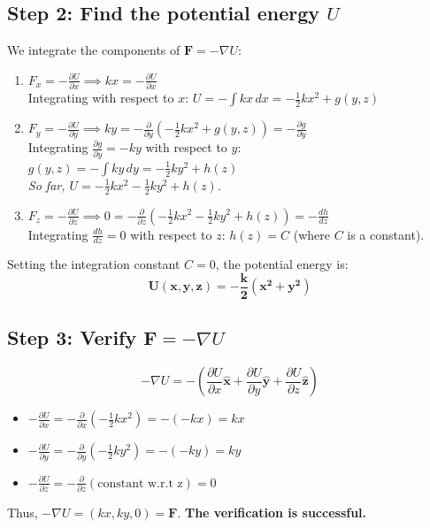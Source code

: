 \documentclass[11pt, a4paper]{article} %
\begin{document}
\subsection*{Step 2: Find the potential energy $U$}
We integrate the components of $\mathbf{F} = -\nabla U$:
\begin{enumerate}
    \item $F_x = -\frac{\partial U}{\partial x} \implies kx = -\frac{\partial U}{\partial x}$ \\
    Integrating with respect to $x$:
    $U = -\int kx \, dx = -\frac{1}{2}kx^2 + g(y, z)$

    \item $F_y = -\frac{\partial U}{\partial y} \implies ky = -\frac{\partial}{\partial y}\left(-\frac{1}{2}kx^2 + g(y, z)\right) = -\frac{\partial g}{\partial y}$ \\
    Integrating $\frac{\partial g}{\partial y} = -ky$ with respect to $y$:
    $g(y, z) = -\int ky \, dy = -\frac{1}{2}ky^2 + h(z)$ \\
    \emph{So far, $U = -\frac{1}{2}kx^2 - \frac{1}{2}ky^2 + h(z)$.}

    \item $F_z = -\frac{\partial U}{\partial z} \implies 0 = -\frac{\partial}{\partial z}\left(-\frac{1}{2}kx^2 - \frac{1}{2}ky^2 + h(z)\right) = -\frac{dh}{dz}$ \\
    Integrating $\frac{dh}{dz} = 0$ with respect to $z$:
    $h(z) = C$ (where $C$ is a constant).
\end{enumerate}
Setting the integration constant $C=0$, the potential energy is:
$$\boldsymbol{U(x, y, z) = -\frac{k}{2}(x^2 + y^2)}$$

\subsection*{Step 3: Verify $\mathbf{F} = -\nabla U$}
$$-\nabla U = -\left(\frac{\partial U}{\partial x}\hat{\mathbf{x}} + \frac{\partial U}{\partial y}\hat{\mathbf{y}} + \frac{\partial U}{\partial z}\hat{\mathbf{z}}\right)$$
\begin{itemize}
    \item $-\frac{\partial U}{\partial x} = -\frac{\partial}{\partial x}\left(-\frac{1}{2}kx^2\right) = -(-kx) = kx$
    \item $-\frac{\partial U}{\partial y} = -\frac{\partial}{\partial y}\left(-\frac{1}{2}ky^2\right) = -(-ky) = ky$
    \item $-\frac{\partial U}{\partial z} = -\frac{\partial}{\partial z}\left( \text{constant w.r.t z} \right) = 0$
\end{itemize}
Thus, $-\nabla U = (kx, ky, 0) = \mathbf{F}$. \textbf{The verification is successful.}
\end{document}
